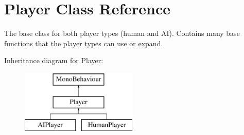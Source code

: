 \hypertarget{class_player}{}\section{Player Class Reference}
\label{class_player}


The base class for both player types (human and A\+I). Contains many base functions that the player types can use or expand.  


Inheritance diagram for Player\+:\begin{figure}[H]
\begin{center}
\leavevmode
\includegraphics[height=3.000000cm]{class_player}
\end{center}
\end{figure}
